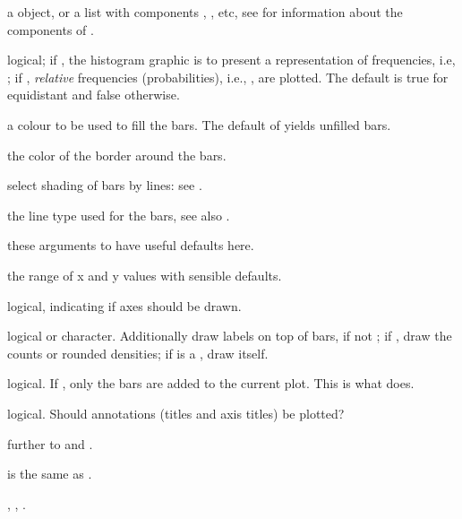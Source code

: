 \begin{Arguments}
\begin{ldescription}
\item[\code{x}] a  object, or a list with components
, , etc, see  for
information about the components of .
\item[\code{freq}] logical; if , the
histogram graphic is to present a representation of frequencies, i.e,
; if , \emph{relative} frequencies
(probabilities), i.e., , are plotted.  The
default is true for equidistant  and false otherwise.
\item[\code{col}] a colour to be used to fill the bars.  The default of
 yields unfilled bars.
\item[\code{border}] the color of the border around the bars.
\item[\code{angle, density}] select shading of bars by lines:
see .
\item[\code{lty}] the line type used for the bars, see also .
\item[\code{main, sub, xlab, ylab}] these arguments to  have useful
defaults here.
\item[\code{xlim, ylim}] the range of x and y values with sensible defaults.
\item[\code{axes}] logical, indicating if axes should be drawn.
\item[\code{labels}] logical or character.  Additionally draw labels on top of bars,
if not ; if , draw the counts or rounded
densities; if  is a , draw itself.
\item[\code{add}] logical.  If , only the bars are added to the
current plot.  This is what  does.
\item[\code{ann}] logical.  Should annotations (titles and axis titles) be plotted?
\item[\code{...}] further  to
 and .
\end{ldescription}
\end{Arguments}
%
\begin{Details}\relax
{} is the same as
.
\end{Details}
%
\begin{SeeAlso}\relax
{},
,
.
\end{SeeAlso}
